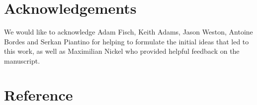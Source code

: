 \documentclass{article}
\begin{document}
\section{Acknowledgements}

We would like to acknowledge Adam Fisch, Keith Adams, Jason Weston, Antoine Bordes and Serkan Piantino for helping to formulate the initial ideas that led to this work, as well as Maximilian Nickel who provided helpful feedback on the manuscript.
\section{Reference}



\end{document}
